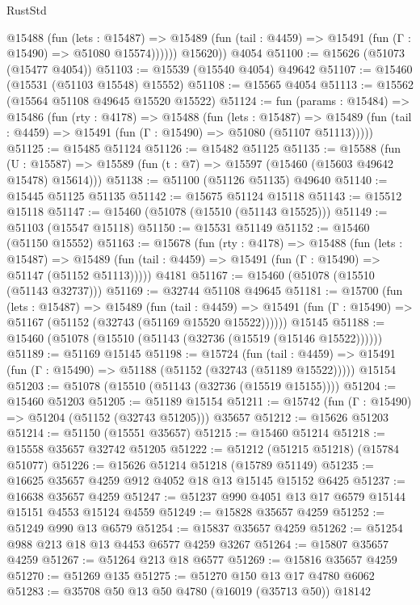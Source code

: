 \begin{lexlean}{RustStd}
\begin{coremodule}
            @15488
              (fun (lets : @15487) =>
              @15489 (fun (tail : @4459) => @15491 (fun (Γ : @15490) => @51080 @15574))))))
        @15620))
    @4054
@51100 := @15626 (@51073 (@15477 @4054))
@51103 := @15539 (@15540 @4054) @49642
@51107 := @15460 (@15531 (@51103 @15548) @15552)
@51108 := @15565 @4054
@51113 := @15562 (@15564 @51108 @49645 @15520 @15522)
@51124 := fun (params : @15484) =>
  @15486
    (fun (rty : @4178) =>
    @15488
      (fun (lets : @15487) =>
      @15489 (fun (tail : @4459) => @15491 (fun (Γ : @15490) => @51080 (@51107 @51113)))))
@51125 := @15485 @51124
@51126 := @15482 @51125
@51135 := @15588
    (fun (U : @15587) => @15589 (fun (t : @7) => @15597 (@15460 (@15603 @49642 @15478) @15614)))
@51138 := @51100 (@51126 @51135) @49640
@51140 := @15445 @51125 @51135
@51142 := @15675 @51124 @15118
@51143 := @15512 @15118
@51147 := @15460 (@51078 (@15510 (@51143 @15525)))
@51149 := @51103 (@15547 @15118)
@51150 := @15531 @51149
@51152 := @15460 (@51150 @15552)
@51163 := @15678
    (fun (rty : @4178) =>
    @15488
      (fun (lets : @15487) =>
      @15489 (fun (tail : @4459) => @15491 (fun (Γ : @15490) => @51147 (@51152 @51113)))))
    @4181
@51167 := @15460 (@51078 (@15510 (@51143 @32737)))
@51169 := @32744 @51108 @49645
@51181 := @15700
    (fun (lets : @15487) =>
    @15489
      (fun (tail : @4459) =>
      @15491 (fun (Γ : @15490) => @51167 (@51152 (@32743 (@51169 @15520 @15522))))))
    @15145
@51188 := @15460 (@51078 (@15510 (@51143 (@32736 (@15519 (@15146 @15522))))))
@51189 := @51169 @15145
@51198 := @15724
    (fun (tail : @4459) => @15491 (fun (Γ : @15490) => @51188 (@51152 (@32743 (@51189 @15522)))))
    @15154
@51203 := @51078 (@15510 (@51143 (@32736 (@15519 @15155))))
@51204 := @15460 @51203
@51205 := @51189 @15154
@51211 := @15742 (fun (Γ : @15490) => @51204 (@51152 (@32743 @51205))) @35657
@51212 := @15626 @51203
@51214 := @51150 (@15551 @35657)
@51215 := @15460 @51214
@51218 := @15558 @35657 @32742 @51205
@51222 := @51212 (@51215 @51218) (@15784 @51077)
@51226 := @15626 @51214 @51218 (@15789 @51149)
@51235 := @16625 @35657 @4259 @912 @4052 @18 @13 @15145 @15152 @6425
@51237 := @16638 @35657 @4259
@51247 := @51237 @990 @4051 @13 @17 @6579 @15144 @15151 @4553 @15124 @4559
@51249 := @15828 @35657 @4259
@51252 := @51249 @990 @13 @6579
@51254 := @15837 @35657 @4259
@51262 := @51254 @988 @213 @18 @13 @4453 @6577 @4259 @3267
@51264 := @15807 @35657 @4259
@51267 := @51264 @213 @18 @6577
@51269 := @15816 @35657 @4259
@51270 := @51269 @135
@51275 := @51270 @150 @13 @17 @4780 @6062
@51283 := @35708 @50 @13 @50 @4780 (@16019 (@35713 @50)) @18142

\end{coremodule}
\end{lexlean}
